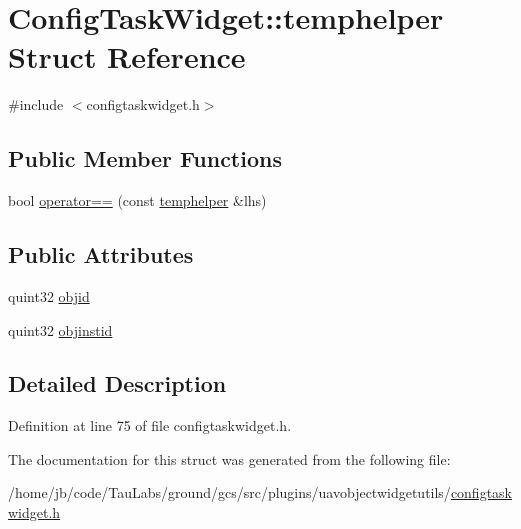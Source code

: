 \hypertarget{struct_config_task_widget_1_1temphelper}{\section{\-Config\-Task\-Widget\-:\-:temphelper \-Struct \-Reference}
\label{struct_config_task_widget_1_1temphelper}
}


{\ttfamily \#include $<$configtaskwidget.\-h$>$}

\subsection*{\-Public \-Member \-Functions}
\begin{DoxyCompactItemize}
\item 
bool \hyperlink{group___u_a_v_object_widget_utils_gaf38e83f721ec231506c2aa0bd3268280}{operator==} (const \hyperlink{struct_config_task_widget_1_1temphelper}{temphelper} \&lhs)
\end{DoxyCompactItemize}
\subsection*{\-Public \-Attributes}
\begin{DoxyCompactItemize}
\item 
quint32 \hyperlink{group___u_a_v_object_widget_utils_ga4c750b1bce138cf6e002f73fca580c4d}{objid}
\item 
quint32 \hyperlink{group___u_a_v_object_widget_utils_ga80a5419befd7432330b2ffb95368f4ed}{objinstid}
\end{DoxyCompactItemize}


\subsection{\-Detailed \-Description}


\-Definition at line 75 of file configtaskwidget.\-h.



\-The documentation for this struct was generated from the following file\-:\begin{DoxyCompactItemize}
\item 
/home/jb/code/\-Tau\-Labs/ground/gcs/src/plugins/uavobjectwidgetutils/\hyperlink{configtaskwidget_8h}{configtaskwidget.\-h}\end{DoxyCompactItemize}
